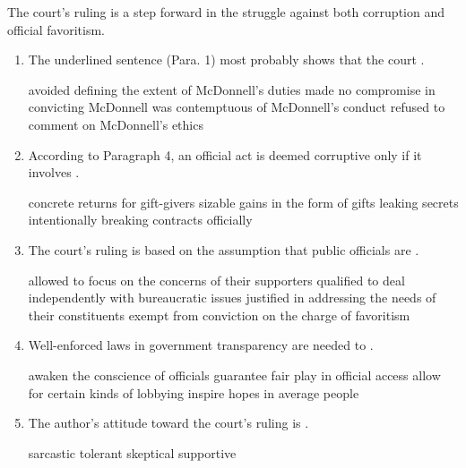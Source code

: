 The court's ruling is a step forward in the struggle against both
corruption and official favoritism.

\begin{enumerate}[resume]
	\item
The underlined sentence (Para. 1) most probably shows that the court \lineread.

\fourchoices
{avoided defining the extent of McDonnell's duties}
{made no compromise in convicting McDonnell}
{was contemptuous of McDonnell's conduct}
{refused to comment on McDonnell's ethics}



\item
 According to Paragraph 4, an official act is deemed corruptive only
if it involves \lineread.


\fourchoices
{concrete returns for gift-givers}
{sizable gains in the form of gifts}
{leaking secrets intentionally}
{breaking contracts officially}



\item
The court's ruling is based on the assumption that public officials
are \lineread.


\fourchoices
{allowed to focus on the concerns of their supporters}
{qualified to deal independently with bureaucratic issues}
{justified in addressing the needs of their constituents}
{exempt from conviction on the charge of favoritism}


\item
Well-enforced laws in government transparency are needed to \lineread.


\fourchoices
{awaken the conscience of officials}
{guarantee fair play in official access}
{allow for certain kinds of lobbying}
{inspire hopes in average people}



\item
The author's attitude toward the court's ruling is \lineread.


\fourchoices
{sarcastic}
{tolerant}
{skeptical}
{supportive}





\end{enumerate}

